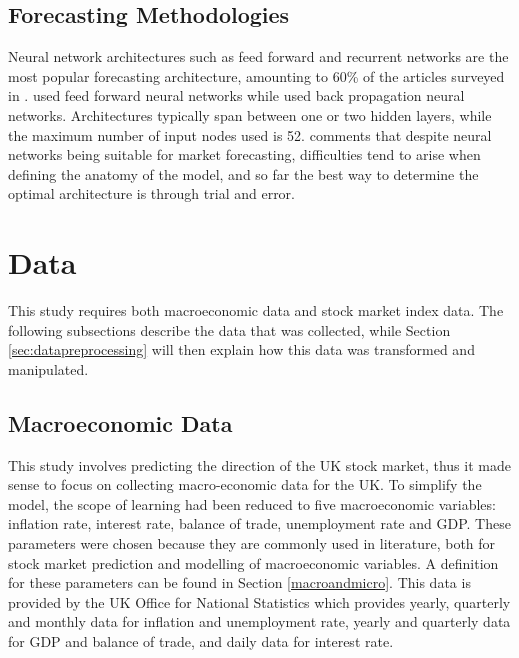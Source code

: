 \documentclass{UoYCSproject}
\begin{document}
\subsection{Forecasting Methodologies}
Neural network architectures such as feed forward and recurrent networks are the most popular forecasting architecture, amounting to 60\% of the articles surveyed in  \cite{atsalakis2009surveying}. \cite{ajith2003hybrid, andreou2000testing, pantazopoulos1998financial,phua2001neural, refenes1997neural, thawornwong2004adaptive} used feed forward neural networks while \cite{barnes2000study, leigh2002analysis, witkowska1995neural} used back propagation neural networks. Architectures typically span between one or two hidden layers, while the maximum number of input nodes used is 52. \cite{atsalakis2009surveying} comments that despite neural networks being suitable for market forecasting, difficulties tend to arise when defining the anatomy of the model, and so far the best way to determine the optimal architecture is through trial and error. 

\section{Data} 
\label{sec:data}
This study requires both macroeconomic data and stock market index data. The following subsections describe the data that was collected, while Section \ref{sec:datapreprocessing} will then explain how this data was transformed and manipulated.

\subsection{Macroeconomic Data}
This study involves predicting the direction of the UK stock market, thus it made sense to focus on collecting macro-economic data for the UK. To simplify the model, the scope of learning had been reduced to five macroeconomic variables: inflation rate, interest rate, balance of trade,  unemployment rate and GDP. These parameters were chosen because they are commonly used in literature, both for stock market prediction and modelling of macroeconomic variables. A definition for these parameters can be found in Section \ref{macroandmicro}. This data is provided by the UK Office for National Statistics which provides yearly, quarterly and monthly data for inflation and unemployment rate, yearly and quarterly data for GDP and balance of trade, and daily data for interest rate. 
\end{document}
